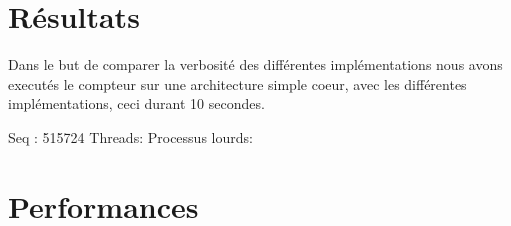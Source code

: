 \documentclass[a4paper]{article}
\begin{document}
 

\section{Résultats}

Dans le but de comparer la verbosité des différentes implémentations
nous avons executés le compteur sur une architecture simple coeur, avec
les différentes implémentations, ceci durant 10 secondes.

Seq : 515724
Threads:
Processus lourds:
 
\section{Performances}
\end{document}
